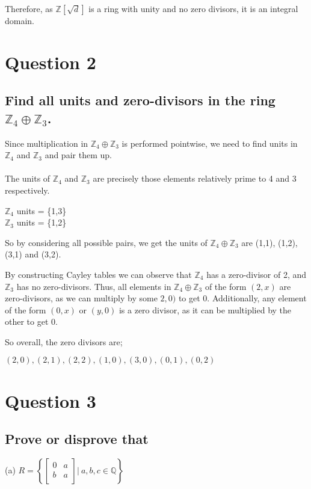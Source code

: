 \documentclass{article}
\begin{document}
Therefore, as \(\mathds{Z}[\sqrt{d}]\) is a ring with unity and no zero divisors, it is an integral domain.
\section*{Question 2}
\subsection*{Find all units and zero-divisors in the ring \(\mathds{Z}_4 \oplus \mathds{Z}_3\).}

\solution
Since multiplication in \(\mathds{Z}_4 \oplus \mathds{Z}_3\) is performed pointwise, we need to find units in \(\mathds{Z}_4\) and \(\mathds{Z}_3\) and pair them up.
\\\\
The units of \(\mathds{Z}_4\) and \(\mathds{Z}_3\) are precisely those elements relatively prime to 4 and 3 respectively.

\hspace* \(\mathds{Z}_4\) units = \{1,3\}\\
\hspace* \(\mathds{Z}_3\) units = \{1,2\}

So by considering all possible pairs, we get the units of \(\mathds{Z}_4 \oplus \mathds{Z}_3\) are (1,1), (1,2), (3,1) and (3,2).

By constructing Cayley tables we can observe that \(\mathds{Z}_4\) has a zero-divisor of 2, and \(\mathds{Z}_3\) has no zero-divisors. Thus, all elements in \(\mathds{Z}_4 \oplus \mathds{Z}_3\) of the form \((2,x)\) are zero-divisors, as we can multiply by some \(2,0)\) to get 0. Additionally, any element of the form \((0,x)\) or \((y,0)\) is a zero divisor, as it can be multiplied by the other to get 0.

So overall, the zero divisors are;

\((2,0), (2,1), (2,2), (1,0), (3,0), (0,1), (0,2)\)

\pagebreak
\section*{Question 3}
\subsection*{Prove or disprove that}

(a) \(R = \left\{
  \left[ {\begin{array}{cc}
   0 & a \\
   b & a \\
  \end{array} } \right] \rvert\: a,b,c \in \mathds{Q} \right\}
\)
\end{document}
